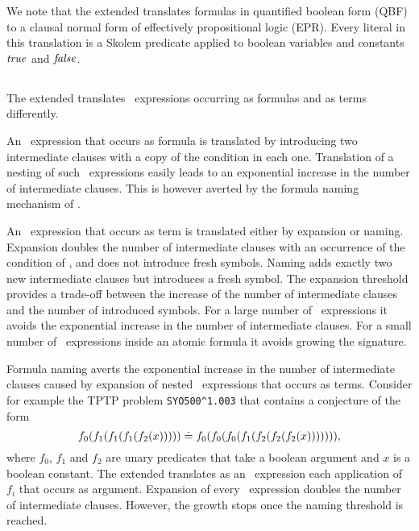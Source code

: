 We note that the extended \newcnf{} translates formulas in quantified boolean form (QBF) to a clausal normal form of effectively propositional logic (EPR). Every literal in this translation is a Skolem predicate applied to boolean variables and constants $\mathit{true}$ and $\mathit{false}$.


\subsection{\ITE}
The extended \newcnf{} translates \ITE\ expressions occurring as formulas and as terms differently.

An \ITE\ expression that occurs as formula is translated by introducing two intermediate clauses with a copy of the condition in each one. Translation of a nesting of such \ITE\ expressions easily leads to an exponential increase in the number of intermediate clauses. This is however averted by the formula naming mechanism of \newcnf{}.

An \ITE\ expression that occurs as term is translated either by expansion or naming. Expansion doubles the number of intermediate clauses with an occurrence of the condition of \ITE, and does not introduce fresh symbols. Naming adds exactly two new intermediate clauses but introduces a fresh symbol. The expansion threshold provides a trade-off between the increase of the number of intermediate clauses and the number of introduced symbols. For a large number of \ITE\ expressions it avoids the exponential increase in the number of intermediate clauses. For a small number of \ITE\ expressions inside an atomic formula it avoids growing the signature.

Formula naming averts the exponential increase in the number of intermediate clauses caused by expansion of nested \ITE\ expressions that occurs as terms. Consider for example the TPTP problem \verb'SYO500^1.003' that contains a conjecture of the form $$f_0(f_1(f_1(f_1(f_2(x))))) \doteq f_0(f_0(f_0(f_1(f_2(f_2(f_2(x))))))),$$ where $f_0$, $f_1$ and $f_2$ are unary predicates that take a boolean argument and $x$ is a boolean constant. The extended \newcnf{} translates as an \ITE\ expression each application of $f_i$ that occurs as argument. Expansion of every \ITE\ expression doubles the number of intermediate clauses. However, the growth stops once the naming threshold is reached.

